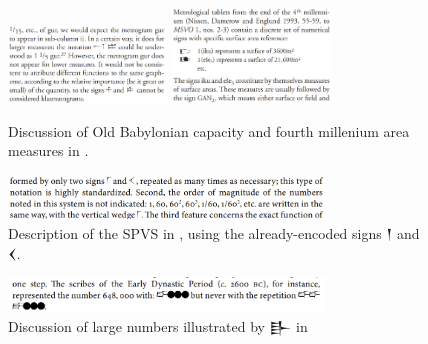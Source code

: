 \documentclass[10pt, a4paper, twoside]{article}
\newcommand\threeŊešTwoC{{\proposalfont\symbol{"1256D}}}
\newcommand\threeŊešʾuC{{\proposalfont\symbol{"12576}}}
\newcommand\threeŠarTwoC{{\proposalfont\symbol{"1257B}}}
\newcommand\threeŠarʾuC{{\proposalfont\symbol{"12584}}}
\begin{document}
\begin{figure}[H]
  \begin{center}
  \includegraphics[width=0.375\textwidth]{proust-9a.png}
  \includegraphics[width=0.375\textwidth]{proust-9.png}
  \caption[]{Discussion of Old Babylonian\footnotemark{} capacity and fourth millenium area measures in \cite[9]{Proust2009}.\label{proust9}}
  \end{center}
\end{figure}
\begin{figure}[H]
  \begin{center}
  \includegraphics[width=0.75\textwidth]{chambon-58.png}
  \caption{
    Description of the SPVS in \cite[58]{Chambon2012},
    using the already-encoded signs {\xsuxfont 𒁹} and {\xsuxfont 𒌋}.\label{chambon58}}
  \end{center}
\end{figure}
\begin{figure}[H]
  \begin{center}
  \includegraphics[width=0.75\textwidth]{chambon-59.png}
  \caption[]{Discussion of large numbers illustrated by {\xsuxfont 𒃲\threeŠarTwoC}\footnotemark{} in
                \cite[59]{Chambon2012}\label{chambon59}}
  \end{center}
\end{figure}
\end{document}
